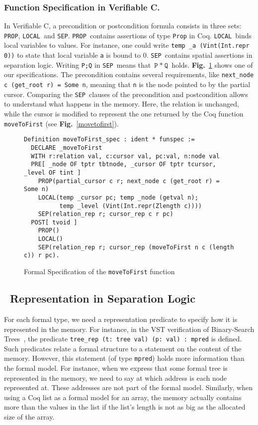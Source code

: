 \def\prop{\lstinline[language=Coq]{PROP}}
\def\local{\lstinline[language=Coq]{LOCAL}}
\def\sep{\lstinline[language=Coq]{SEP}}

\subsubsection{Function Specification in Verifiable C.}
In Verifiable C, a precondition or postcondition formula consists in three sets: \prop, \local\ and \sep.
\prop\ contains assertions of type \texttt{Prop} in Coq.
\local\ binds local variables to values. For instance, one could write \texttt{temp \_a (Vint(Int.repr 0))} to state that local variable \texttt{a} is bound to 0.
\sep\ contains spatial assertions in separation logic. Writing \texttt{P;Q} in \sep\ means that $\texttt{P}~*~\texttt{Q}$ holds.
\textbf{Fig.}~\ref{spec} shows one of our specifications.
The precondition contains several requirements, like \texttt{next\_node c (get\_root r) = Some n}, meaning that \texttt{n} is the node pointed to by the partial cursor.
Comparing the \sep\ clauses of the precondition and postcondition allows to understand what happens in the memory.
Here, the relation is unchanged, while the cursor is modified to represent the one returned by the Coq function \texttt{moveToFirst} (see \textbf{Fig.}~\ref{movetofirst}).

\begin{figure}
\begin{lstlisting}[language=Coq]
Definition moveToFirst_spec : ident * funspec :=
  DECLARE _moveToFirst
  WITH r:relation val, c:cursor val, pc:val, n:node val
  PRE[ _node OF tptr tbtnode, _cursor OF tptr tcursor, _level OF tint ]
    PROP(partial_cursor c r; next_node c (get_root r) = Some n)
    LOCAL(temp _cursor pc; temp _node (getval n);
          temp _level (Vint(Int.repr(Zlength c))))
    SEP(relation_rep r; cursor_rep c r pc)
  POST[ tvoid ]
    PROP()
    LOCAL()
    SEP(relation_rep r; cursor_rep (moveToFirst n c (length c)) r pc).
\end{lstlisting}
\caption{Formal Specification of the \texttt{moveToFirst} function}
\label{spec}
\end{figure}


\subsection{\btrees\ Representation in Separation Logic}
For each formal type, we need a representation predicate to specify how it is represented in the memory.
For instance, in the VST verification of Binary-Search Trees~\cite{vst}, the predicate \lstinline[language=Coq]{tree_rep (t: tree val) (p: val) : mpred} is defined.
Such predicates relate a formal structure to a statement on the content of the memory.
However, this statement (of type \texttt{mpred}) holds more information than the formal model.
For instance, when we express that some formal tree is represented in the memory, we need to say at which address is each node represented at.
These addresses are not part of the formal model.
Similarly, when using a Coq list as a formal model for an array, the memory actually contains more than the values in the list if the list's length is not as big as the allocated size of the array.


